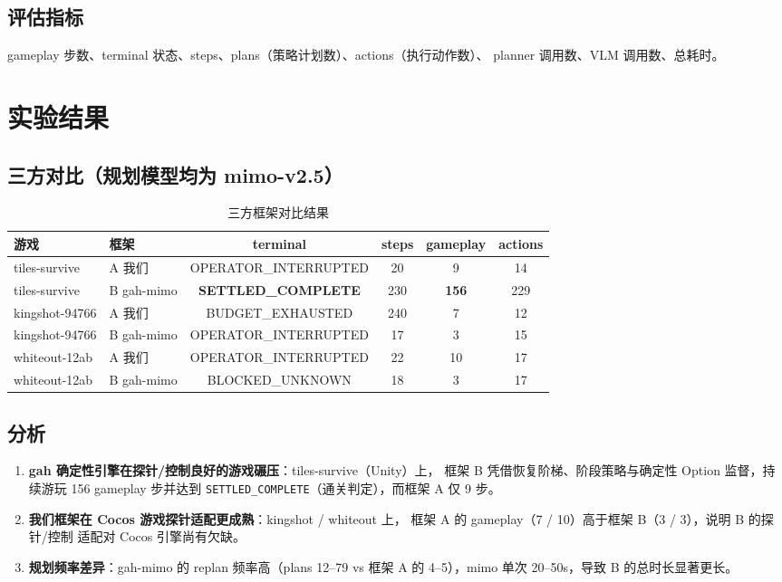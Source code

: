 \documentclass[11pt,a4paper]{article}
\begin{document}
\subsection{评估指标}
gameplay 步数、terminal 状态、steps、plans（策略计划数）、actions（执行动作数）、
planner 调用数、VLM 调用数、总耗时。

\section{实验结果}

\subsection{三方对比（规划模型均为 mimo-v2.5）}

\begin{table}[h!]
\centering
\caption{三方框架对比结果}
\begin{tabular}{llcccc}
\toprule
游戏 & 框架 & terminal & steps & gameplay & actions \\
\midrule
tiles-survive & A 我们 & OPERATOR\_INTERRUPTED & 20 & 9 & 14 \\
tiles-survive & B gah-mimo & \textbf{SETTLED\_COMPLETE} & 230 & \textbf{156} & 229 \\
\midrule
kingshot-94766 & A 我们 & BUDGET\_EXHAUSTED & 240 & 7 & 12 \\
kingshot-94766 & B gah-mimo & OPERATOR\_INTERRUPTED & 17 & 3 & 15 \\
\midrule
whiteout-12ab & A 我们 & OPERATOR\_INTERRUPTED & 22 & 10 & 17 \\
whiteout-12ab & B gah-mimo & BLOCKED\_UNKNOWN & 18 & 3 & 17 \\
\bottomrule
\end{tabular}
\end{table}

\subsection{分析}
\begin{enumerate}[leftmargin=1.5em]
  \item \textbf{gah 确定性引擎在探针/控制良好的游戏碾压}：tiles-survive（Unity）上，
        框架 B 凭借恢复阶梯、阶段策略与确定性 Option 监督，持续游玩 156 gameplay
        步并达到 \texttt{SETTLED\_COMPLETE}（通关判定），而框架 A 仅 9 步。
  \item \textbf{我们框架在 Cocos 游戏探针适配更成熟}：kingshot / whiteout 上，
        框架 A 的 gameplay（7 / 10）高于框架 B（3 / 3），说明 B 的探针/控制
        适配对 Cocos 引擎尚有欠缺。
  \item \textbf{规划频率差异}：gah-mimo 的 replan 频率高（plans 12--79 vs
        框架 A 的 4--5），mimo 单次 20--50s，导致 B 的总时长显著更长。
\end{enumerate}
\end{document}
